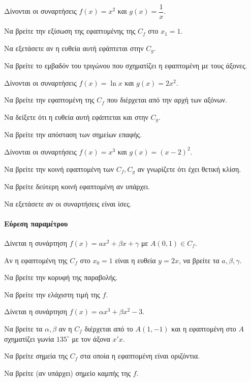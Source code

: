 \documentclass[11pt,a4paper,modern]{FFExercises}
\begin{document}
\askhsh
Δίνονται οι συναρτήσεις $ f(x)=x^2 $ και $ g(x)=\dfrac{1}{x} $.
\begin{alist}
    \item Να βρείτε την εξίσωση της εφαπτομένης της $ C_f $ στο $ x_1=1 $.
    \item Να εξετάσετε αν η ευθεία αυτή εφάπτεται στην $ C_g $.
    \item Να βρείτε το εμβαδόν του τριγώνου που σχηματίζει η εφαπτομένη με τους άξονες.
\end{alist}

\askhsh
Δίνονται οι συναρτήσεις $ f(x)=\ln x $ και $ g(x)=2x^2 $.
\begin{alist}
    \item Να βρείτε την εφαπτομένη της $ C_f $ που διέρχεται από την αρχή των αξόνων.
    \item Να δείξετε ότι η ευθεία αυτή εφάπτεται και στην $ C_g $.
    \item Να βρείτε την απόσταση των σημείων επαφής.
\end{alist}

\askhsh
Δίνονται οι συναρτήσεις $ f(x)=x^3 $ και $ g(x)=(x-2)^2 $.
\begin{alist}
    \item Να βρείτε την κοινή εφαπτομένη των $ C_f, C_g $ αν γνωρίζετε ότι έχει θετική κλίση.
    \item Να βρείτε δεύτερη κοινή εφαπτομένη αν υπάρχει.
    \item Να εξετάσετε αν οι συναρτήσεις είναι ίσες.
\end{alist}

\paragraph{Εύρεση παραμέτρου}
\askhsh
Δίνεται η συνάρτηση $ f(x)=ax^2+\beta x + \gamma $ με $ A(0,1) \in C_f $.
\begin{alist}
    \item Αν η εφαπτομένη της $ C_f $ στο $ x_0=1 $ είναι η ευθεία $ y=2x $, να βρείτε τα $ a,\beta,\gamma $.
    \item Να βρείτε την κορυφή της παραβολής.
    \item Να βρείτε την ελάχιστη τιμή της $ f $.
\end{alist}

\askhsh
Δίνεται η συνάρτηση $ f(x)=\alpha x^3 + \beta x^2 - 3 $.
\begin{alist}
    \item Να βρείτε τα $ \alpha, \beta $ αν η $ C_f $ διέρχεται από το $ A(1,-1) $ και η εφαπτομένη στο $ A $ σχηματίζει γωνία $ 135^\circ $ με τον άξονα $ x'x $.
    \item Να βρείτε σημεία της $ C_f $ στα οποία η εφαπτομένη είναι οριζόντια.
    \item Να βρείτε (αν υπάρχει) σημείο καμπής της $ f $.
\end{alist}
\end{document}
